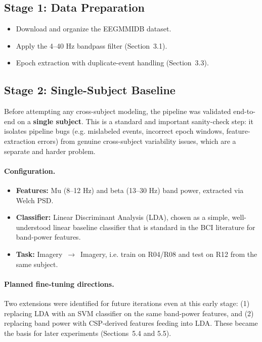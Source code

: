 \documentclass[11pt,a4paper]{article}
\begin{document}
\subsection{Stage 1: Data Preparation}
\begin{itemize}[leftmargin=1.5em]
    \item[\checkmark] Download and organize the EEGMMIDB dataset.
    \item[\checkmark] Apply the 4--40 Hz bandpass filter (Section~3.1).
    \item[$\rightarrow$] Epoch extraction with duplicate-event handling (Section~3.3).
\end{itemize}

\subsection{Stage 2: Single-Subject Baseline}
Before attempting any cross-subject modeling, the pipeline was validated end-to-end on a \textbf{single subject}. This is a standard and important sanity-check step: it isolates pipeline bugs (e.g. mislabeled events, incorrect epoch windows, feature-extraction errors) from genuine cross-subject variability issues, which are a separate and harder problem.

\paragraph{Configuration.}
\begin{itemize}[leftmargin=1.5em]
    \item \textbf{Features:} Mu (8--12 Hz) and beta (13--30 Hz) band power, extracted via Welch PSD.
    \item \textbf{Classifier:} Linear Discriminant Analysis (LDA), chosen as a simple, well-understood linear baseline classifier that is standard in the BCI literature for band-power features.
    \item \textbf{Task:} Imagery~$\rightarrow$~Imagery, i.e. train on R04/R08 and test on R12 from the same subject.
\end{itemize}

\paragraph{Planned fine-tuning directions.} Two extensions were identified for future iterations even at this early stage: (1) replacing LDA with an SVM classifier on the same band-power features, and (2) replacing band power with CSP-derived features feeding into LDA. These became the basis for later experiments (Sections~5.4 and 5.5).
\end{document}
